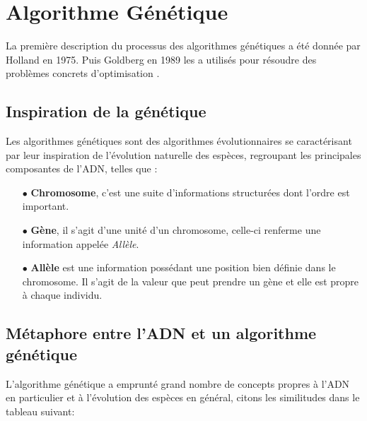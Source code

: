 \section{Algorithme Génétique \cite{GAthese}}
La première description du processus des algorithmes génétiques a été donnée par Holland en 1975. Puis Goldberg en 1989 les a utilisés pour résoudre des problèmes concrets d'optimisation \cite{GAthese}.

\subsection{Inspiration de la génétique }
Les algorithmes génétiques sont des algorithmes évolutionnaires se caractérisant par leur inspiration de l'évolution naturelle des espèces, regroupant les principales composantes de l'ADN, telles que :

\begin{itemize}
	\item[$\bullet$] \textbf{Chromosome}, c'est une suite d'informations structurées dont l'ordre est important.
	\item[$\bullet$] \textbf{Gène}, il s'agit d'une unité d'un chromosome, celle-ci renferme une information appelée \textit{Allèle}.
	\item[$\bullet$] \textbf{Allèle} est une information possédant une position bien définie dans le chromosome. Il s'agit de la valeur que peut prendre un gène et elle est propre à chaque individu.
\end{itemize}



\subsection{Métaphore entre l'ADN et un algorithme génétique}
L'algorithme génétique a emprunté grand nombre de concepts propres à l'ADN en particulier et à l'évolution des espèces en général, citons les similitudes dans le tableau suivant:
   
